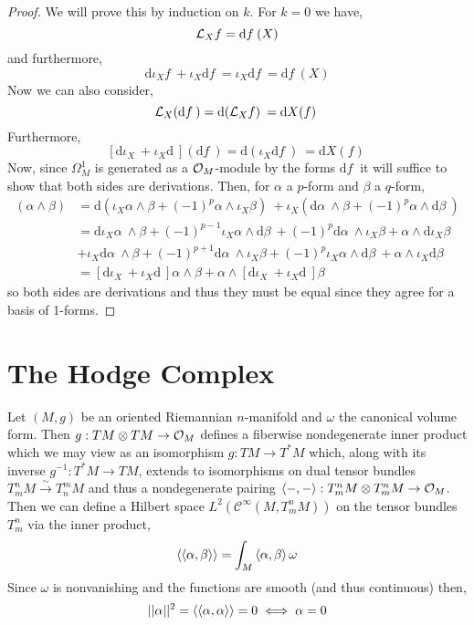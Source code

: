 \documentclass[12pt]{extarticle}
\renewcommand{\d}[1]{ \mathrm{d}#1 \:}
\theoremstyle{definition}
\newenvironment{definition}[1][Definition:]{\begin{trivlist}
\item[\hskip \labelsep {\bfseries #1}]}{\end{trivlist}}
\newcommand{\inner}[2]{\left< #1, #2 \right>}
\begin{document}
\begin{proof}
We will prove this by induction on $k$. For $k = 0$ we have,
\[ \L_X f = \d{f}(X) \]
and furthermore,
\[ \d{\iota_X f} + \iota_X \d{f} = \iota_X \d{f} = \d{f}(X) \]
Now we can also consider,
\[ \L_X (\d{f}) = \d{(\L_X f)} = \d{ X(f)} \]
Furthermore,
\[ [\d{\iota_X} + \iota_X \d{} ](\d{f}) = \d{(\iota_X \d{f})} = \d{X(f)} \] 
Now, since $\Omega^1_M$ is generated as a $\mathcal{O}_{M}$-module by the forms $\d{f}$ it will suffice to show that both sides are derivations. Then, for $\alpha$ a $p$-form and $\beta$ a $q$-form,
\begin{align*}
[\d{\iota_X} + \iota_X \d{} ](\alpha \wedge \beta) & = \d{\left( \iota_X \alpha \wedge \beta + (-1)^p \alpha \wedge \iota_X \beta \right)} + \iota_X {\left( \d{\alpha} \wedge \beta + (-1)^p \alpha \wedge \d{\beta} \right)}
\\
& = \d{\iota_X \alpha} \wedge \beta + (-1)^{p-1} \iota_X \alpha \wedge \d{\beta} + (-1)^p \d{\alpha} \wedge \iota_X \beta + \alpha \wedge \d{\iota_X \beta} 
\\
& + \iota_X \d{\alpha} \wedge \beta + (-1)^{p+1} \d{\alpha} \wedge \iota_X \beta + (-1)^p \iota_X \alpha \wedge \d{\beta} + \alpha \wedge \iota_X \d{\beta}
\\
& = [ \d{\iota_X} + \iota_X \d{} ] \alpha \wedge \beta + \alpha \wedge [ \d{\iota_X} + \iota_X \d{} ]  \beta 
\end{align*}
so both sides are derivations and thus they must be equal since they agree for a basis of 1-forms. 
\end{proof}

\section{The Hodge Complex}



\begin{definition}
Let $(M, g)$ be an oriented Riemannian $n$-manifold and $\omega$ the canonical volume form. Then $g : TM \otimes TM \to \mathcal{O}_{M}$ defines a fiberwise nondegenerate inner product which we may view as an isomorphism $g : TM \to T^*M$ which, along with its inverse $g^{-1} : T^*M \to TM$, extends to isomorphisms on dual tensor bundles $T^n_m M \xrightarrow{\sim} T^m_n M$ and thus a nondegenerate pairing $\inner{-}{-} : T^{n}_{m} M \otimes T^{n}_{m} M \to \struct{M}$.
\bigskip\\
Then we can define a Hilbert space $L^2(\mathcal{C}^\infty(M, T^n_m M))$ on the tensor bundles $T^n_m$ via the inner product,
\[ \Inner{\alpha}{\beta} = \int_M \inner{\alpha}{\beta} \omega \]
Since $\omega$ is nonvanishing and the functions are smooth (and thus continuous) then,
\[ ||\alpha||^2 = \left< \left< \alpha, \alpha \right> \right> = 0 \iff \alpha = 0 \]
 
\end{definition}
\end{document}
